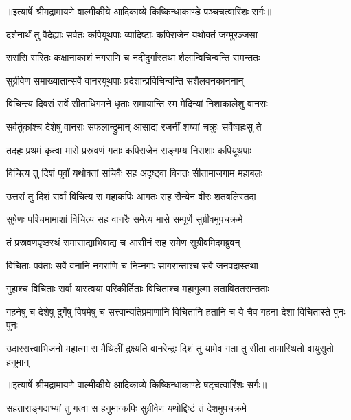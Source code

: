 {॥इत्यार्षे श्रीमद्रामायणे वाल्मीकीये आदिकाव्ये किष्किन्धाकाण्डे पञ्चचत्वारिंशः सर्गः॥}


\twolineshloka
{दर्शनार्थं तु वैदेह्याः सर्वतः कपियूथपाः}
{व्यादिष्टाः कपिराजेन यथोक्तं जग्मुरञ्जसा} %

\twolineshloka
{सरांसि सरितः कक्षानाकाशं नगराणि च}
{नदीदुर्गांस्तथा शैलान्विचिन्वन्ति समन्ततः} %

\twolineshloka
{सुग्रीवेण समाख्यातान्सर्वे वानरयूथपाः}
{प्रदेशान्प्रविचिन्वन्ति सशैलवनकाननान्} %

\twolineshloka
{विचिन्त्य दिवसं सर्वे सीताधिगमने धृताः}
{समायान्ति स्म मेदिन्यां निशाकालेशु वानराः} %

\twolineshloka
{सर्वर्तुकांश्च देशेषु वानराः सफलान्द्रुमान्}
{आसाद्य रजनीं शय्यां चक्रुः सर्वेष्वहःसु ते} %

\twolineshloka
{तदहः प्रथमं कृत्वा मासे प्रस्रवणं गताः}
{कपिराजेन सङ्गम्य निराशाः कपियूथपाः} %

\twolineshloka
{विचित्य तु दिशं पूर्वां यथोक्तां सचिवैः सह}
{अदृष्ट्वा विनतः सीतामाजगाम महाबलः} %

\twolineshloka
{उत्तरां तु दिशं सर्वां विचित्य स महाकपिः}
{आगतः सह सैन्येन वीरः शतबलिस्तदा} %

\twolineshloka
{सुषेणः पश्चिमामाशां विचित्य सह वानरैः}
{समेत्य मासे सम्पूर्णे सुग्रीवमुपचक्रमे} %

\twolineshloka
{तं प्रस्रवणपृष्ठस्थं समासाद्याभिवाद्य च}
{आसीनं सह रामेण सुग्रीवमिदमब्रुवन्} %

\twolineshloka
{विचिताः पर्वताः सर्वे वनानि नगराणि च}
{निम्नगाः सागरान्ताश्च सर्वे जनपदास्तथा} %

\twolineshloka
{गुहाश्च विचिताः सर्वा यास्त्वया परिकीर्तिताः}
{विचिताश्च महागुल्मा लताविततसन्तताः} %

\threelineshloka
{गहनेषु च देशेषु दुर्गेषु विषमेषु च}
{सत्त्वान्यतिप्रमाणानि विचितानि हतानि च}
{ये चैव गहना देशा विचितास्ते पुनः पुनः} %

\fourlineindentedshloka
{उदारसत्त्वाभिजनो महात्मा}
{स मैथिलीं द्रक्ष्यति वानरेन्द्रः}
{दिशं तु यामेव गता तु सीता}
{तामास्थितो वायुसुतो हनूमान्} %


{॥इत्यार्षे श्रीमद्रामायणे वाल्मीकीये आदिकाव्ये किष्किन्धाकाण्डे षट्चत्वारिंशः सर्गः॥}


\twolineshloka
{सहताराङ्गदाभ्यां तु गत्वा स हनुमान्कपिः}
{सुग्रीवेण यथोद्दिष्टं तं देशमुपचक्रमे} %

